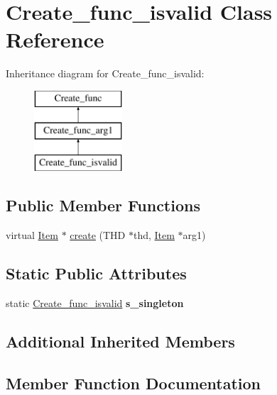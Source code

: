 \hypertarget{classCreate__func__isvalid}{}\section{Create\+\_\+func\+\_\+isvalid Class Reference}
\label{classCreate__func__isvalid}
Inheritance diagram for Create\+\_\+func\+\_\+isvalid\+:\begin{figure}[H]
\begin{center}
\leavevmode
\includegraphics[height=3.000000cm]{classCreate__func__isvalid}
\end{center}
\end{figure}
\subsection*{Public Member Functions}
\begin{DoxyCompactItemize}
\item 
virtual \mbox{\hyperlink{classItem}{Item}} $\ast$ \mbox{\hyperlink{classCreate__func__isvalid_a610ed376d29ffddc2168ec521ce1f32c}{create}} (T\+HD $\ast$thd, \mbox{\hyperlink{classItem}{Item}} $\ast$arg1)
\end{DoxyCompactItemize}
\subsection*{Static Public Attributes}
\begin{DoxyCompactItemize}
\item 
\mbox{\label{classCreate__func__isvalid_ad89f0214d8cf05fadc1a8ca780ef7509}} 
static \mbox{\hyperlink{classCreate__func__isvalid}{Create\+\_\+func\+\_\+isvalid}} {\bfseries s\+\_\+singleton}
\end{DoxyCompactItemize}
\subsection*{Additional Inherited Members}


\subsection{Member Function Documentation}
\mbox{\label{classCreate__func__isvalid_a610ed376d29ffddc2168ec521ce1f32c}} 
